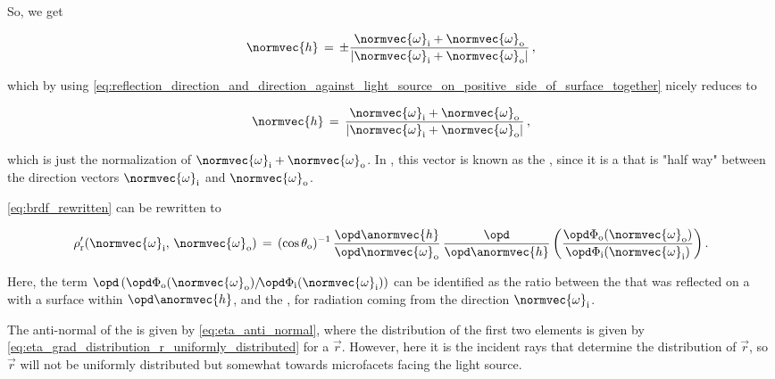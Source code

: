 So, we get

\begin{equation} \label{eq:halfway_vector_two_alternatives}
\normvec{h} \,=\, \pm\frac{\normvec{\omega}_{\text{i}} + \normvec{\omega}_{\text{o}}}{|\normvec{\omega}_{\text{i}}+\normvec{\omega}_{\text{o}}|}\,,
\end{equation}

which by using \eqref{eq:reflection_direction_and_direction_against_light_source_on_positive_side_of_surface_together} nicely reduces to

\begin{equation} \label{eq:halfway_vector_final}
\normvec{h} \,=\, \frac{\normvec{\omega}_{\text{i}} + \normvec{\omega}_{\text{o}}}{|\normvec{\omega}_{\text{i}}+\normvec{\omega}_{\text{o}}|}\,,
\end{equation}

which is just the normalization of $\normvec{\omega}_{\text{i}}+\normvec{\omega}_{\text{o}}$. In , this vector is known as the , since it is a  that is "half way" between the direction vectors $\normvec{\omega}_{\text{i}}$ and $\normvec{\omega}_{\text{o}}$.

\eqref{eq:brdf_rewritten} can be rewritten to

\begin{equation} \label{eq:brdf_from_ratio_between_fluxes}
\rho'_{\text{r}}(\normvec{\omega}_{\text{i}},\, \normvec{\omega}_{\text{o}}) \,=\, (\cos\theta_{\text{o}})^{-1}\, \frac{\opd \anormvec{h}}{\opd \normvec{\omega}_{\text{o}}}\,\frac{\opd}{\opd \anormvec{h}}\left(\frac{\opd \Phi_{\text{o}}(\normvec{\omega}_{\text{o}})}{\opd \Phi_{\text{i}}(\normvec{\omega}_{\text{i}})}\right).
\end{equation}

Here, the term $\opd\,(\opd \Phi_{\text{o}}(\normvec{\omega}_{\text{o}})/\!\opd \Phi_{\text{i}}(\normvec{\omega}_{\text{i}}))$ can be identified as the ratio between the  that was reflected on a \microfacet with a surface  within $\opd \anormvec{h}$, and the , for radiation coming from the direction $\normvec{\omega}_{\text{i}}$.

The anti-normal of the \microfacet is given by \eqref{eq:eta_anti_normal}, where the distribution of the first two elements is given by \eqref{eq:eta_grad_distribution_r_uniformly_distributed} for a  $\vec{r}$. However, here it is the incident rays that determine the distribution of $\vec{r}$, so $\vec{r}$ will not be uniformly distributed but somewhat \biased towards microfacets facing the light source.

